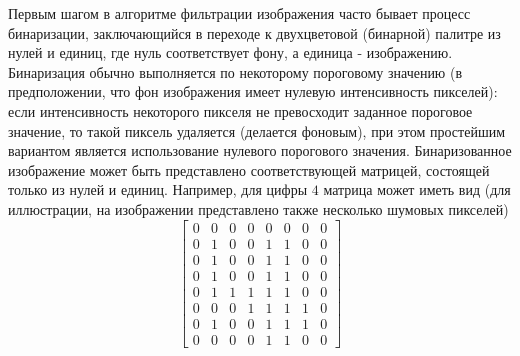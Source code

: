 \documentclass[a4paper,12pt,russian]{article} %
\begin{document}
Первым шагом в алгоритме фильтрации изображения часто бывает процесс бинаризации, заключающийся в переходе к двухцветовой (бинарной) палитре из нулей и единиц, где нуль соответствует фону, а единица - изображению.
Бинаризация обычно выполняется по некоторому пороговому значению (в предположении, что фон изображения имеет нулевую интенсивность пикселей): если интенсивность некоторого пикселя не превосходит заданное пороговое значение, то такой пиксель удаляется (делается фоновым), при этом простейшим вариантом является использование нулевого порогового значения.
Бинаризованное изображение может быть представлено соответствующей матрицей, состоящей только из нулей и единиц.
Например, для цифры $4$ матрица может иметь вид (для иллюстрации, на изображении представлено также несколько шумовых пикселей)
$$
	\begin{bmatrix}
		0 & 0 & 0 & 0 & 0 & 0 & 0 & 0 \\
		0 & 1 & 0 & 0 & 1 & 1 & 0 & 0 \\
		0 & 1 & 0 & 0 & 1 & 1 & 0 & 0 \\
		0 & 1 & 0 & 0 & 1 & 1 & 0 & 0 \\
		0 & 1 & 1 & 1 & 1 & 1 & 0 & 0 \\
		0 & 0 & 0 & 1 & 1 & 1 & 1 & 0 \\
		0 & 1 & 0 & 0 & 1 & 1 & 1 & 0 \\
		0 & 0 & 0 & 0 & 1 & 1 & 0 & 0	
	\end{bmatrix}
$$
\end{document}
